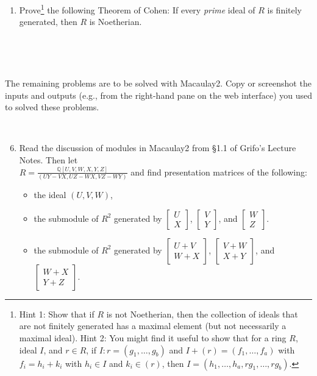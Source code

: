 \documentclass[12pt]{amsart}
\newcommand{\Q}{\mathbb{Q}}
\begin{document}
\begin{enumerate}
\





\item Prove\footnote{Hint 1: Show that if $R$ is not Noetherian, then the collection of ideals that are not finitely generated has a maximal element (but not necessarily a maximal ideal). Hint 2: You might find it useful to show that for a ring $R$, ideal $I$, and $r\in R$, if $I:r= (g_1,\dots,g_b)$ and $I+(r) = (f_1,\dots, f_a)$ with $f_i = h_i + k_i$ with $h_i\in I$ and $k_i\in (r)$, then $I=(h_1,\dots,h_a, rg_1,\dots,rg_b)$.} the following Theorem of Cohen: If every \emph{prime} ideal of $R$ is finitely generated, then $R$ is Noetherian.


\

\end{enumerate}


\


The remaining problems are to be solved with Macaulay2. Copy or screenshot the inputs and outputs (e.g., from the right-hand pane on the web interface) you used to solved these problems.

\

\begin{enumerate}\setcounter{enumi}{5}


\item  Read the discussion of modules in Macaulay2 from \S1.1 of Grifo's Lecture Notes. Then let \\ $\displaystyle{R=\frac{\Q[U,V, W , X , Y , Z]}{(UY-VX,UZ-WX,VZ-WY)}}$ and find presentation matrices of the following:
\begin{itemize}
\item the ideal $(U,V,W)$,
\item the submodule of $R^2$ generated by $\begin{bmatrix} U \\ X \end{bmatrix}$, $\begin{bmatrix} V \\ Y \end{bmatrix}$, and $\begin{bmatrix} W \\ Z \end{bmatrix}$.
\item the submodule of $R^2$ generated by $\begin{bmatrix} U +V \\ W+X \end{bmatrix}$, $\begin{bmatrix} V+W \\ X+Y \end{bmatrix}$, and $\begin{bmatrix} W+X \\ Y+Z \end{bmatrix}$.
\end{itemize}
\end{enumerate}
\end{document}
